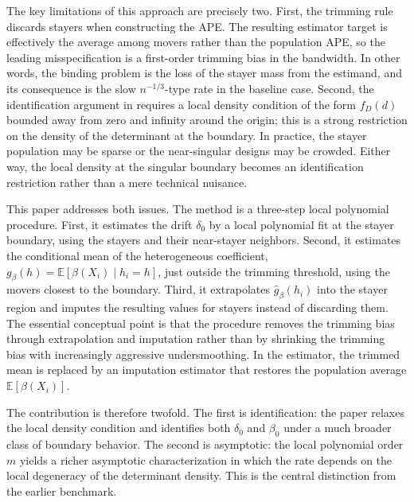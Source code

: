 \documentclass{article}
\begin{document}
The key limitations of this approach are precisely two. First, the trimming rule discards stayers when constructing the APE. The resulting estimator target is effectively the average among movers rather than the population APE, so the leading misspecification is a first-order trimming bias in the bandwidth. In other words, the binding problem is the loss of the stayer mass from the estimand, and its consequence is the slow $n^{-1/3}$-type rate in the baseline case. Second, the identification argument in \cite{grahampowell} requires a local density condition of the form $f_D(d)$ bounded away from zero and infinity around the origin; this is a strong restriction on the density of the determinant at the boundary. In practice, the stayer population may be sparse or the near-singular designs may be crowded. Either way, the local density at the singular boundary becomes an identification restriction rather than a mere technical nuisance.

This paper addresses both issues. The method is a three-step local polynomial procedure. First, it estimates the drift $\delta_0$ by a local polynomial fit at the stayer boundary, using the stayers and their near-stayer neighbors. Second, it estimates the conditional mean of the heterogeneous coefficient, $g_\beta(h)=\mathbb{E}[\beta(X_i)\mid h_i=h]$, just outside the trimming threshold, using the movers closest to the boundary. Third, it extrapolates $\hat g_\beta(h_i)$ into the stayer region and imputes the resulting values for stayers instead of discarding them. The essential conceptual point is that the procedure removes the trimming bias through extrapolation and imputation rather than by shrinking the trimming bias with increasingly aggressive undersmoothing. In the estimator, the trimmed mean is replaced by an imputation estimator that restores the population average $\mathbb{E}[\beta(X_i)]$.

The contribution is therefore twofold. The first is identification: the paper relaxes the local density condition and identifies both $\delta_0$ and $\beta_0$ under a much broader class of boundary behavior. The second is asymptotic: the local polynomial order $m$ yields a richer asymptotic characterization in which the rate depends on the local degeneracy of the determinant density. This is the central distinction from the earlier benchmark.
\end{document}
